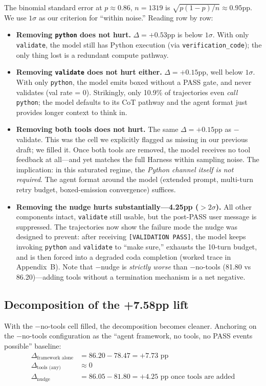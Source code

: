 \documentclass[10pt]{article}
\begin{document}
The binomial standard error at $p\!\approx\!0.86$, $n\!=\!1319$ is $\sqrt{p(1{-}p)/n}\approx 0.95$pp. We use $1\sigma$ as our criterion for ``within noise.'' Reading row by row:
\begin{itemize}
  \item \textbf{Removing \texttt{python} does not hurt.} $\Delta=+0.53$pp is below $1\sigma$. With only \texttt{validate}, the model still has Python execution (via \texttt{verification\_code}); the only thing lost is a redundant compute pathway.
  \item \textbf{Removing \texttt{validate} does not hurt either.} $\Delta=+0.15$pp, well below $1\sigma$. With only \texttt{python}, the model emits boxed without a PASS gate, and never validates (val rate = 0). Strikingly, only 10.9\% of trajectories even \emph{call} \texttt{python}; the model defaults to its CoT pathway and the agent format just provides longer context to think in.
  \item \textbf{Removing both tools does not hurt.} The same $\Delta=+0.15$pp as $-$validate. This was the cell we explicitly flagged as missing in our previous draft; we filled it. Once both tools are removed, the model receives no tool feedback at all---and yet matches the full Harness within sampling noise. The implication: in this saturated regime, the \emph{Python channel itself is not required}. The agent format around the model (extended prompt, multi-turn retry budget, boxed-emission convergence) suffices.
  \item \textbf{Removing the nudge hurts substantially---4.25pp ($>\!2\sigma$).} All other components intact, \texttt{validate} still usable, but the post-PASS user message is suppressed. The trajectories now show the failure mode the nudge was designed to prevent: after receiving \texttt{[VALIDATION PASS]}, the model keeps invoking \texttt{python} and \texttt{validate} to ``make sure,'' exhausts the 10-turn budget, and is then forced into a degraded coda completion (worked trace in Appendix~B). Note that $-$nudge is \emph{strictly worse} than $-$no-tools (81.80 vs 86.20)---adding tools without a termination mechanism is a net negative.
\end{itemize}

\subsection{Decomposition of the +7.58pp lift}
\label{sec:ablation-decomp}

With the $-$no-tools cell filled, the decomposition becomes cleaner. Anchoring on the $-$no-tools configuration as the ``agent framework, no tools, no PASS events possible'' baseline:
\begin{align*}
\Delta_{\text{framework alone}} &= 86.20 - 78.47 = +7.73\text{ pp}\\
\Delta_{\text{tools (any)}} &\approx 0\\
\Delta_{\text{nudge}} &= 86.05 - 81.80 = +4.25\text{ pp once tools are added}
\end{align*}
\end{document}

